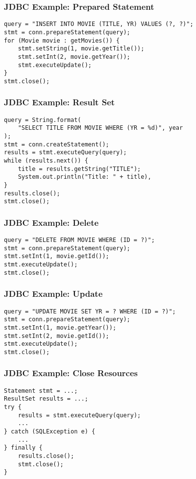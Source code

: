 \documentclass[dvipsnames]{beamer}
\theoremstyle{plain}
\begin{document}
\begin{frame}[fragile]
  \frametitle{JDBC Example: Prepared Statement}

  \begin{lstlisting}
query = "INSERT INTO MOVIE (TITLE, YR) VALUES (?, ?)";
stmt = conn.prepareStatement(query);
for (Movie movie : getMovies()) {
    stmt.setString(1, movie.getTitle());
    stmt.setInt(2, movie.getYear());
    stmt.executeUpdate();
}
stmt.close();
  \end{lstlisting}
\end{frame}

\begin{frame}[fragile]
  \frametitle{JDBC Example: Result Set}

  \begin{lstlisting}
query = String.format(
    "SELECT TITLE FROM MOVIE WHERE (YR = %d)", year
);
stmt = conn.createStatement();
results = stmt.executeQuery(query);
while (results.next()) {
    title = results.getString("TITLE");
    System.out.println("Title: " + title),
}
results.close();
stmt.close();
  \end{lstlisting}
\end{frame}

\begin{frame}[fragile]
  \frametitle{JDBC Example: Delete}

  \begin{lstlisting}
query = "DELETE FROM MOVIE WHERE (ID = ?)";
stmt = conn.prepareStatement(query);
stmt.setInt(1, movie.getId());
stmt.executeUpdate();
stmt.close();
  \end{lstlisting}
\end{frame}

\begin{frame}[fragile]
  \frametitle{JDBC Example: Update}

  \begin{lstlisting}
query = "UPDATE MOVIE SET YR = ? WHERE (ID = ?)";
stmt = conn.prepareStatement(query);
stmt.setInt(1, movie.getYear());
stmt.setInt(2, movie.getId());
stmt.executeUpdate();
stmt.close();
  \end{lstlisting}
\end{frame}

\begin{frame}[fragile]
  \frametitle{JDBC Example: Close Resources}

  \begin{lstlisting}
Statement stmt = ...;
ResultSet results = ...;
try {
    results = stmt.executeQuery(query);
    ...
} catch (SQLException e) {
    ...
} finally {
    results.close();
    stmt.close();
}
  \end{lstlisting}
\end{frame}
\end{document}
